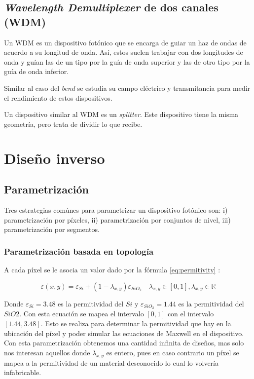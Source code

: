 \subsection{\emph{Wavelength Demultiplexer} de dos canales (WDM)}

Un WDM es un dispositivo fotónico que se encarga de guiar un haz de ondas de acuerdo a su longitud de onda.
Así, estos suelen trabajar con dos longitudes de onda y guían las de un tipo por la guía de onda superior y las de otro tipo por la guía de onda inferior.

Similar al caso del \emph{bend} se estudia su campo eléctrico y transmitancia para medir el rendimiento de estos dispositivos.

Un dispositivo similar al WDM es un \emph{splitter}. Este dispositivo tiene la misma geometría, pero trata de dividir lo que recibe.

\section{Diseño inverso}

\subsection{Parametrización}

Tres estrategias comúnes para parametrizar un dispositivo fotónico son: i) parametrización por píxeles, ii) parametrización por conjuntos de nivel, iii) parametrización por segmentos.

\subsubsection{Parametrización basada en topología}

A cada píxel se le asocia un valor dado por la fórmula \ref{eq:permitivity} \citep{Su2020}:

\begin{equation}
  \varepsilon(x, y) = \varepsilon_{Si} + (1 - \lambda_{x,y}) \varepsilon_{SiO_2} \quad \lambda_{x, y} \in [0, 1], \lambda_{x, y} \in \mathbb{R} 
\label{eq:permitivity}
\end{equation}

Donde $\varepsilon_{Si} = 3.48$ es la permitividad del $Si$ y $\varepsilon_{SiO_2} = 1.44$ es la permitividad del $SiO2$.
Con esta ecuación se mapea el intervalo $[0, 1]$ con el intervalo $[1.44, 3.48]$. 
Esto se realiza para determinar la permitividad que hay en la ubicación del píxel y poder simular las ecuaciones de Maxwell en el dispositivo.
Con esta parametrización obtenemos una cantidad infinita de diseños, mas solo nos interesan aquellos donde $\lambda_{x,y}$ es entero, pues en caso contrario un píxel se mapea a la permitividad de un material desconocido lo cual lo volvería infabricable.


